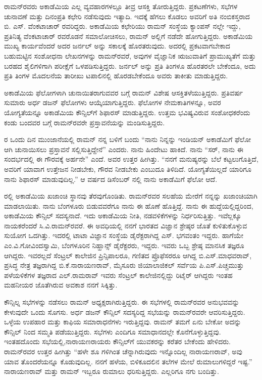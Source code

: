 ರಾಮನ್‍ರವರು ಅಕಾಡೆಮಿಯ ಎಲ್ಲ ವ್ಯವಹಾರಗಳಲ್ಲೂ ತೀವ್ರ ಆಸಕ್ತಿ ತೋರುತ್ತಿದ್ದರು. ಪ್ರಕಟಣೆಗಳು, ಸಭೆಗಳ ಚುನಾವಣೆ ಮತ್ತು ದಿನಂಪ್ರತಿ ಕಛೇರಿ ನಡೆಸುವುದು ಇತ್ಯಾದಿ. ಇದಕ್ಕೆ ಹೆಗಲು ಕೊಡಲು ಅವರಿಗೆ ಅತಿ ನಂಬಿಕಸ್ತರಾದ ಬಿ. ಎಸ್. ವೆಂಕಟಾಚಾರ್ ರವರಿದ್ದರು. ಅಕಾಡೆಮಿಯ ಕಛೇರಿಯು ರಾಮನ್ ಸಂಸ್ಥೆಯ ಕ್ಯಾಂಪಸ್ ನಲ್ಲೇ ಇದ್ದು, ಪ್ರತಿನಿತ್ಯ ವೆಂಕಟಾಚಾರ್ ರವರೊಡನೆ ಸಮಾಲೋಚಿಸಲು, ರಾಮನ್ ಅಲ್ಲಿಗೆ ನಡೆದೇ ಹೋಗುತ್ತಿದ್ದರು. ಅಕಾಡೆಮಿಯ ಮುಖ್ಯ ಕಾರ್ಯವೆಂದರೆ ಅದರ ಜರ್ನಲ್  ಅನ್ನು ಸಕಾಲಕ್ಕೆ ಹೊರತರುವುದು. ಅದರಲ್ಲಿ ಪ್ರಕಟವಾಗಬೇಕಾದ ಬಹುಮಟ್ಟಿನ ಸಂಶೋಧನಾ ಲೇಖನಗಳನ್ನು ರಾಮನ್‍ರವರೆ, ಅವುಗಳ ವೈಜ್ಞಾನಿಕ ಋಜುವಾತಿಗೆ ಪ್ರಾಮುಖ್ಯತೆಗೆ ಮತ್ತು ಬರಹದ ಶೈಲಿಗಳಿಗಾಗಿ ಪರೀಕ್ಷೆಗೆ ಒಳಪಡಿಸುತ್ತಿದ್ದರು. ಜರ್ನಲ್ ಅನ್ನು ಪ್ರತಿ ತಿಂಗಳೂ ಹೊರತರಲೇ ಬೇಕೆಂದೂ, ಅದು ಪ್ರತಿ ತಿಂಗಳ ಮೊದಲನೆಯ ತಾರೀಖು ಟಪಾಲಿನಲ್ಲಿ ಹೊರಡಬೇಕೆಂದೂ ಅವರು ತಾಕೀತು ಮಾಡುತ್ತಿದ್ದರು.

ಅಕಾಡೆಮಿಯ ಫೆಲೋಗಳಾಗಿ ಚುನಾಯಿತರಾಗುವವರ ಬಗ್ಗೆ ರಾಮನ್ ವಿಶೇಷ ಆಸಕ್ತಿ\break ತಳೆಯುತ್ತಿದ್ದರು. ಪ್ರತಿವರ್ಷ ಸುಮಾರು ಅರ್ಧ ಡಜನ್ ಫೆಲೋಗಳು ಆಯ್ಕೆಯಾಗುತ್ತಿದ್ದರು. ಫೆಲೋಗಳ ನೇಮಕಾತಿಗಳನ್ನೂ, ಅವರ ಯೋಗ್ಯತೆಯನ್ನೂ ಅಕಾಡೆಮಿಯ ಕೌನ್ಸಿಲ್‍ಗೆ ಶಿಫಾರಸ್ ಮಾಡುತ್ತಿದ್ದರು. ಉತ್ತಮ ಭವಿಷ್ಯವಿರುವ ಸಂಶೋಧಕರೆಂದು ಕಂಡು ಬಂದವರ ಬಗ್ಗೆ ರಾಮನ್‍ರವರೇ ಪ್ರಸ್ತಾವನೆಯನ್ನು ಮಂಡಿಸುತ್ತಿದ್ದರು.

ರ ಒಂದು ದಿನ ಮುಂಜಾನೆಯಲ್ಲಿ ರಾಮನ್ ನನ್ನ ಬಳಿಗೆ ಬಂದು  “ನಾನು ನಿನ್ನನ್ನು ಇಂಡಿಯನ್ ಅಕಾಡೆಮಿಗೆ ಫೆಲೋ ಆಗಿ ಚುನಾಯಿಸಲು ಪ್ರಸ್ತಾವನೆ ಸಲ್ಲಿಸುತ್ತಿದ್ದೇನೆ” ಎಂದರು. ನಾನು ಹಿಂದೇಟು ಹಾಕಿದೆ. ನಾನು “ಸರ್, ನಾನು ಈ ಸಂದರ್ಭದಲ್ಲಿ ಈ ಗೌರವಕ್ಕೆ ಅರ್ಹನೇ” ಎಂದೆ. ಅವರ ಉತ್ತರ ಹೀಗಿತ್ತು.  “ನನಗೆ ಮನುಷ್ಯರನ್ನು ಬೆಲೆ ಕಟ್ಟಲುಗೊತ್ತಿದೆ, ಅವರಿಗೆ ಯಾವಾಗ ಉತ್ತೇಜನ ನೀಡಬೇಕು, ಗೌರವ ನೀಡಬೇಕು ಎಂಬುದೂ ತಿಳಿದಿದೆ. ಯೋಗ್ಯತೆಯಿಲ್ಲದೆ ಯಾರಿಗೂ ನಾನು ಶಿಫಾರಸ್ ಮಾಡುವುದಿಲ್ಲ.” ಆ ವರ್ಷದ ಡಿಸೆಂಬರ್ ನಲ್ಲಿ ನಾನು ಅಕಾಡೆಮಿಗೆ ಫೆಲೋ ಆದೆ.

ರಲ್ಲಿ ಅಕಾಡೆಮಿಯ ಖಜಾಂಚಿ ಸ್ಥಾನವು ತೆರವುಗೊಂಡಿತು. ರಾಮನ್‍ರವರ ಸಲಹೆಯ ಮೇರೆಗೆ ನನ್ನನ್ನು ಖಜಾಂಚಿಯಾಗಿ ಮಾಡಲಾಯಿತು. ನಾನು ಬೆಂಗಳೂರು ಬಿಡುವವರೆಗೂ ನಾನು ಈ ಹೊಣೆ ಹೊತ್ತಿದ್ದೆ. ನಾನು ಈ ಹುದ್ದೆಯಲ್ಲಿದ್ದರಿಂದ, ಅಕಾಡೆಮಿಯ ಕೌನ್ಸಿಲ್ ಸದಸ್ಯನಾದೆ. ಇದು ಅಕಾಡೆಮಿಯ ನೀತಿ, ನಡವಳಿಕೆಗಳನ್ನು ನಿರ್ಧರಿಸುತ್ತಿತ್ತು. ಇವೆಲ್ಲಕ್ಕೂ ನಾಯಕರೆಂದರೆ ಸಿ.ವಿ.ರಾಮನ್‍ರವರೆ. ಈ ಅವಧಿಯಲ್ಲಿ ನನಗೆ ಭಾರತದ ವಿಜ್ಞಾನ ಶ್ರೇಷ್ಠರ ಜೊತೆ ಕುಳಿತುಕೊಳ್ಳುವ ಸುಯೋಗ ಒದಗಿತ್ತು. ಇದರಲ್ಲಿ ಟಾಟಾ ವಿಜ್ಞಾನ ಸಂಸ್ಥೆಯ ಡೈರೆಕ್ಟರಾಗಿದ್ದ ಎಸ್. ಭಗವಂತಂ ಇದ್ದರು. ಹಾಗೆಯೇ ಎಂ.ವಿ.ಗೋವಿಂದಸ್ವಾಮಿ, ಬೆಂಗಳೂರಿನ ನಿಹ್ಹಾನ್ಸ್ ಡೈರೆಕ್ಟರರು, ಇದ್ದರು. ಇವರು ಒಬ್ಬ ಶ್ರೇಷ್ಠ ಮಾನಸಿಕ ತಜ್ಞರೂ ಆಗಿದ್ದರು. ಇವರಲ್ಲದೆ ಸೆಂಟ್ರಲ್ ಕಾಲೇಜಿನ ಪ್ರಿನ್ಸಿಪಾಲರೂ, ಗಣಿತದ ಪ್ರೊಫೆಸರರೂ ಆಗಿದ್ದ ಬಿ.ಎಸ್.ಮಾಧವರಾವ್, ಪ್ರಸಿದ್ಧ ನೇತ್ರ ತಜ್ಞರಾಗಿದ್ದ ಬಿ.ಕೆ.ನಾರಾಯಣರಾವ್, ಮೈಸೂರು ಜಿಯಾಲಾಜಿಕಲ್ ಸರ್ವೆಯ ಪಿ.ಎಸ್.ಪಿಚ್ಚಮುತ್ತು ಪಳೆಯಳಿಕೆಗಳ ತಜ್ಞರಾದ ಎಲ್.ರಾಮರಾವ್ ಇವರು ಸೆಂಟ್ರಲ್ ಕಾಲೇಜಿನಲ್ಲಿದ್ದು ರಿಟೈರ್ ಆಗಿದ್ದರು ಇಂತಹ ಮಹನೀಯರ ಜೊತೆಗಿರುವ ಅವಕಾಶ ನನಗೆ ಸಿಕ್ಕಿತ್ತು.

\vskip 2pt

ಕೌನ್ಸಿಲ್ನ ಸಭೆಗಳನ್ನು ನಡೆಸಲು ರಾಮನ್ ಅಧ್ಯಕ್ಷರಾಗಿರುತ್ತಿದ್ದರು. ಈ ಸಭೆಗಳಲ್ಲಿ ರಾಮನ್‍ರವರ ಅನುಭವವನ್ನು ಕೇಳುವುದೇ ಒಂದು ಸೊಗಸು. ಅರ್ಧ ಡಜನ್ ಕೌನ್ಸಿಲ್ ಸದಸ್ಯರಿದ್ದ ಸಭೆಯನ್ನು ರಾಮನ್‍ರವರೇ ಆವರಿಸುತ್ತಿದ್ದರು. ಒಳ್ಳೆಯ ಉಪಹಾರ ಮತ್ತು ಕಾಫಿಯ ಸಮಾರಾಧನೆಗಳು ಇರುತ್ತಿದ್ದವು. ರಾಮನ್ ತಮಗೆ ಏನು ಬೇಕೋ ಅದನ್ನು ಕೌನ್ಸಿಲ್ ನಿಂದ ಸಮ್ಮತಿ ಪಡೆಯುತ್ತಿದ್ದರು. ಸಭೆಗಳು ಎಂದಿಗೂ ಸಮಾಧಾನದಲ್ಲೇ ಕೊನೆಗೊಳ್ಳುತ್ತಿದ್ದವು. ಇಂತಹದೊಂದು ಸಭೆಯಲ್ಲಿ,\break ನಾರಾಯಣರಾಯರು ಕೌನ್ಸಿಲ್‍ಗೆ ಯುವಕರನ್ನು ಕರೆತರ ಬೇಕೆಂದು ಹೇಳಿದರು. ರಾಮನ್‍ರವರ ಉತ್ತರ ಹೀಗಿತ್ತು “ಹಳೇ ಶೂ ಗಳಿಗಿಂತ ಚೆನ್ನಾಗಿರುವುದು ಇನ್ನೊಂದಿಲ್ಲ ನಾರಾಯಣರಾವ್, ಅವು ಯಾವ ತೊಂದರೆಯನ್ನೂ ಕೊಡುವುದಿಲ್ಲ. ನನಗೆ ಹಳೆಯ, ಬಿಳಿಕೂದಲಿನ ತಲೆಗಳ ಮೇಲೆ ರುಮಾಲುಗಳಿದ್ದರೆ ಇಷ್ಟ.” ನಾರಾಯಣರಾವ್ ಮತ್ತು ರಾಮನ್ ಇಬ್ಬರೂ ರುಮಾಲು ಧರಿಸುತ್ತಿದ್ದರು. ಎಲ್ಲರಿಗೂ ನಗು ಬಂದಿತ್ತು.


